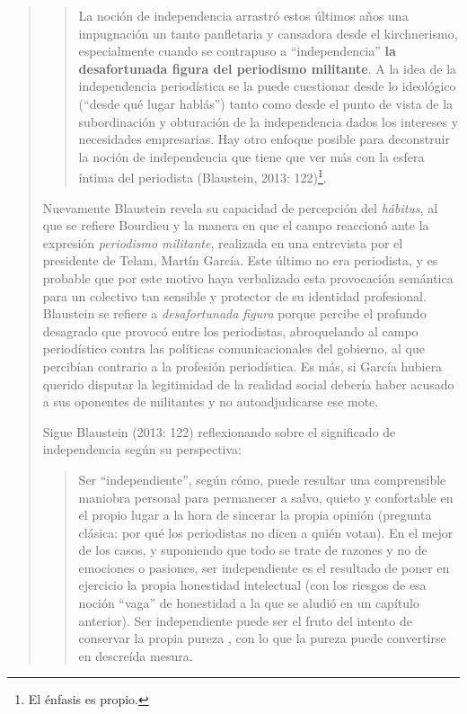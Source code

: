 \begin{quote}
\begin{quote}
	La noción de independencia arrastró estos últimos años una impugnación un tanto panfletaria y cansadora  desde el kirchnerismo, especialmente cuando se contrapuso a ``independencia'' \textbf{la desafortunada figura del periodismo militante}. A la idea de la independencia periodística se la puede cuestionar desde lo ideológico (``desde qué lugar hablás'') tanto como desde el punto de vista de la subordinación y obturación de la independencia dados los intereses y necesidades empresarias. Hay otro enfoque posible para deconstruir la noción de independencia que tiene que ver más con la esfera íntima del periodista (Blaustein, 2013: 122)\footnote{El énfasis es propio.}.
\end{quote}


Nuevamente Blaustein revela su capacidad de percepción del \emph{hábitus}, al que se refiere Bourdieu y la manera en que el campo reaccionó ante la expresión \emph{periodismo militante}, realizada en una entrevista por el presidente de Telam, Martín García. Este último no era periodista, y es probable que por este motivo haya verbalizado esta provocación semántica para un colectivo tan sensible y protector de su identidad profesional. Blaustein se refiere a \emph{desafortunada figura} porque percibe el profundo desagrado que provocó entre los periodistas, abroquelando al campo periodístico contra las políticas comunicacionales del gobierno, al que percibían contrario a la profesión periodística. Es más, si García hubiera querido disputar la legitimidad de la realidad social debería haber acusado a sus oponentes de militantes y no autoadjudicarse ese mote.

Sigue Blaustein (2013: 122) reflexionando sobre el significado de independencia según su perspectiva:

\begin{quote}
	Ser ``independiente'', según cómo, puede resultar una comprensible maniobra personal para permanecer a salvo, quieto y confortable en el propio lugar a la hora de sincerar la propia opinión (pregunta clásica: por qué los periodistas no dicen a quién votan). En el mejor de los casos, y suponiendo que todo se trate de razones y no de emociones o pasiones, ser independiente es el resultado de poner en ejercicio la propia honestidad intelectual (con los riesgos de esa noción ``vaga'' de honestidad a la que se aludió en un capítulo anterior). Ser independiente puede ser el fruto del intento de conservar la propia pureza , con lo que la pureza puede convertirse en descreída mesura.
\end{quote}



\end{quote}

